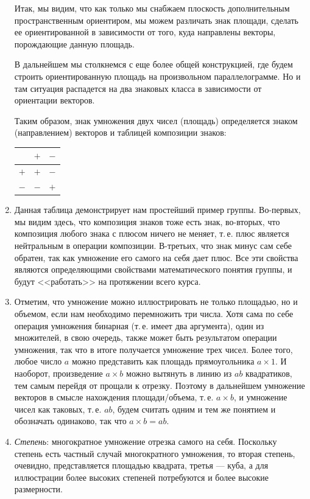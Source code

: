 \begin{enumerate}
Итак, мы видим, что как только мы снабжаем плоскость дополнительным пространственным ориентиром, мы можем различать знак площади, сделать ее ориентированной в зависимости от того, куда направлены векторы, порождающие данную площадь.

В дальнейшем мы столкнемся с еще более общей конструкцией, где будем строить ориентированную площадь на произвольном параллелограмме. Но и там ситуация распадется на два знаковых класса в зависимости от ориентации векторов.

Таким образом, знак умножения двух чисел (площадь) определяется знаком (направлением) векторов и таблицей композиции знаков:
\begin{center}
\begin{tabular}{c|c|c|}
  & $+$ & $-$ \\
 \hline
$+$ & $+$ & $-$ \\
 \hline
$-$ & $-$ & $+$ \\
\hline
\end{tabular}
\end{center}
\item Данная таблица демонстрирует нам простейший пример группы. Во-первых, мы видим здесь, что композиция знаков тоже есть знак, во-вторых, что композиция любого знака с плюсом ничего не меняет, т.\,е. плюс является нейтральным в операции композиции. В-третьих, что знак минус сам себе обратен, так как умножение его самого на себя дает плюс. Все эти свойства являются определяющими свойствами математического понятия группы, и будут <<работать>> на протяжении всего курса.


\item Отметим, что умножение можно иллюстрировать не только площадью, но и объемом, если нам необходимо перемножить три числа. Хотя сама по себе операция умножения бинарная (т.\,е. имеет два аргумента), один из множителей, в свою очередь, также может быть результатом операции умножения, так что в итоге получается умножение трех чисел. Более того, любое число $a$ можно представить как площадь прямоугольника $a\times 1$. И наоборот, произведение $a\times b$ можно вытянуть в линию из $ab$ квадратиков, тем самым перейдя от прощали к отрезку. Поэтому в дальнейшем умножение векторов в смысле нахождения площади/объема, т.\,е. $a\times b$, и умножение чисел как таковых, т.\,е. $ab$, будем считать одним и тем же понятием и обозначать одинаково, так что $a\times b=ab$.

\item \textit{Степень}: многократное умножение отрезка самого на себя. Поскольку степень есть частный случай многократного умножения, то вторая степень, очевидно, представляется площадью квадрата, третья --- куба, а для иллюстрации более высоких степеней потребуются и более высокие размерности.
\end{enumerate}


